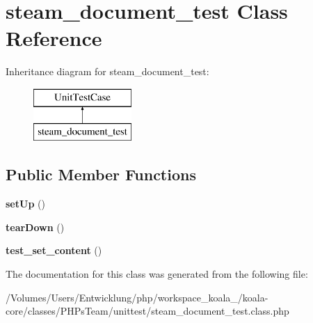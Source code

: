 \hypertarget{classsteam__document__test}{
\section{steam\_\-document\_\-test Class Reference}
\label{classsteam__document__test}
}
Inheritance diagram for steam\_\-document\_\-test:\begin{figure}[H]
\begin{center}
\leavevmode
\includegraphics[height=2.000000cm]{classsteam__document__test}
\end{center}
\end{figure}
\subsection*{Public Member Functions}
\begin{DoxyCompactItemize}
\item 
\hypertarget{classsteam__document__test_abc33dc8975bb1d9cdeace0866716b02e}{
{\bfseries setUp} ()}
\label{classsteam__document__test_abc33dc8975bb1d9cdeace0866716b02e}

\item 
\hypertarget{classsteam__document__test_a20ab693bfb70a149958394bdc40c855e}{
{\bfseries tearDown} ()}
\label{classsteam__document__test_a20ab693bfb70a149958394bdc40c855e}

\item 
\hypertarget{classsteam__document__test_abe9625206a273606e8c09a65316910a5}{
{\bfseries test\_\-set\_\-content} ()}
\label{classsteam__document__test_abe9625206a273606e8c09a65316910a5}

\end{DoxyCompactItemize}


The documentation for this class was generated from the following file:\begin{DoxyCompactItemize}
\item 
/Volumes/Users/Entwicklung/php/workspace\_\-koala\_/koala-\/core/classes/PHPsTeam/unittest/steam\_\-document\_\-test.class.php\end{DoxyCompactItemize}
